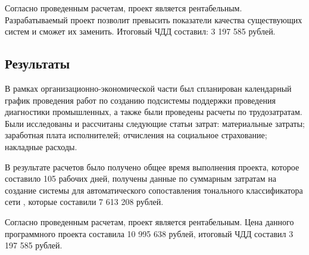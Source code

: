         Согласно проведенным расчетам, проект является рентабельным.
        Разрабатываемый проект позволит превысить показатели качества существующих
        систем и сможет их заменить. Итоговый ЧДД составил: 3 197 585 рублей.

    \subsection{Результаты}
        В рамках организационно-экономической части был спланирован календарный
        график проведения работ по созданию подсистемы поддержки проведения
        диагностики промышленных, а также были проведены расчеты по трудозатратам.
        Были исследованы и рассчитаны следующие статьи затрат: материальные затраты;
        заработная плата исполнителей; отчисления на социальное страхование;
        накладные расходы.

        В результате расчетов было получено общее время выполнения проекта,
        которое составило 105 рабочих дней, получены данные по суммарным затратам
        на создание системы для автоматического сопоставления тонального классификатора
        сети \twitter, которые составили 7 613 208 рублей.

        Согласно проведенным расчетам, проект является рентабельным.
        Цена данного программного проекта составила 10 995 638 рублей, итоговый
        ЧДД составил 3 197 585 рублей.
